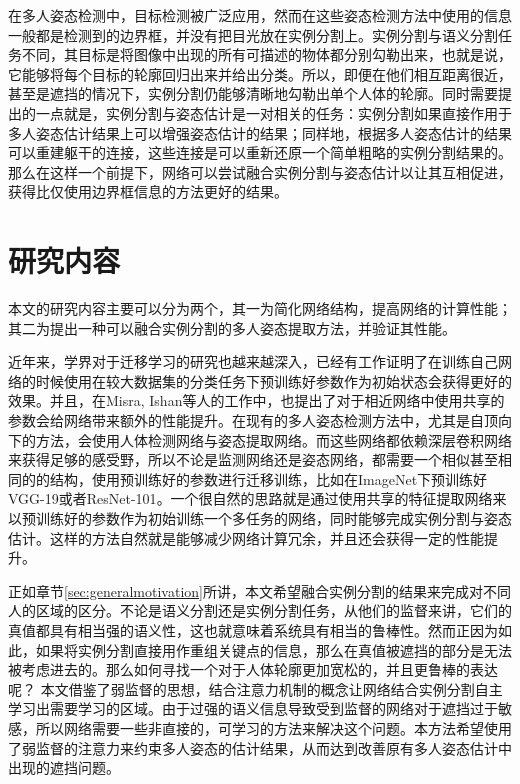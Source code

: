 在多人姿态检测中，目标检测被广泛应用，然而在这些姿态检测方法中使用的信息一般都是检测到的边界框，并没有把目光放在实例分割上。实例分割与语义分割任务不同，其目标是将图像中出现的所有可描述的物体都分别勾勒出来，也就是说，它能够将每个目标的轮廓回归出来并给出分类。所以，即便在他们相互距离很近，甚至是遮挡的情况下，实例分割仍能够清晰地勾勒出单个人体的轮廓。同时需要提出的一点就是，实例分割与姿态估计是一对相关的任务：实例分割如果直接作用于多人姿态估计结果上可以增强姿态估计的结果；同样地，根据多人姿态估计的结果可以重建躯干的连接，这些连接是可以重新还原一个简单粗略的实例分割结果的。那么在这样一个前提下，网络可以尝试融合实例分割与姿态估计以让其互相促进，获得比仅使用边界框信息的方法更好的结果。


\section{研究内容}
\label{sec:generalfield}
本文的研究内容主要可以分为两个，其一为简化网络结构，提高网络的计算性能；其二为提出一种可以融合实例分割的多人姿态提取方法，并验证其性能。

近年来，学界对于迁移学习的研究也越来越深入，已经有工作证明了在训练自己网络的时候使用在较大数据集的分类任务下预训练好参数作为初始状态会获得更好的效果\cite{mishkin2015all}。并且，在Misra, Ishan等人\cite{misra2016cross}的工作中，也提出了对于相近网络中使用共享的参数会给网络带来额外的性能提升。在现有的多人姿态检测方法中，尤其是自顶向下的方法，会使用人体检测网络与姿态提取网络。而这些网络都依赖深层卷积网络来获得足够的感受野，所以不论是监测网络还是姿态网络，都需要一个相似甚至相同的的结构，使用预训练好的参数进行迁移训练，比如在ImageNet\cite{deng2009imagenet}下预训练好VGG-19\cite{simonyan2014very}或者ResNet-101\cite{He2015Deep}。一个很自然的思路就是通过使用共享的特征提取网络来以预训练好的参数作为初始训练一个多任务的网络，同时能够完成实例分割与姿态估计。这样的方法自然就是能够减少网络计算冗余，并且还会获得一定的性能提升。

正如章节\ref{sec:generalmotivation}所讲，本文希望融合实例分割的结果来完成对不同人的区域的区分。不论是语义分割还是实例分割任务，从他们的监督来讲，它们的真值都具有相当强的语义性，这也就意味着系统具有相当的鲁棒性。然而正因为如此，如果将实例分割直接用作重组关键点的信息，那么在真值被遮挡的部分是无法被考虑进去的。那么如何寻找一个对于人体轮廓更加宽松的，并且更鲁棒的表达呢？
本文借鉴了弱监督的思想，结合注意力机制的概念让网络结合实例分割自主学习出需要学习的区域。由于过强的语义信息导致受到监督的网络对于遮挡过于敏感，所以网络需要一些非直接的，可学习的方法来解决这个问题。本方法希望使用了弱监督的注意力来约束多人姿态的估计结果，从而达到改善原有多人姿态估计中出现的遮挡问题。

